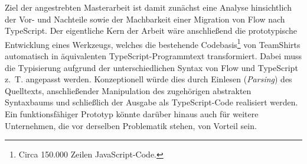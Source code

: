 Ziel der angestrebten Masterarbeit ist damit zunächst eine Analyse hinsichtlich der Vor- und Nachteile sowie der Machbarkeit einer Migration von Flow nach TypeScript. Der eigentliche Kern der Arbeit wäre anschließend die prototypische Entwicklung eines Werkzeugs, welches die bestehende Codebasis\footnote{Circa 150.000 Zeilen JavaScript-Code.} von TeamShirts automatisch in äquivalenten TypeScript-Programm\-text transformiert. Dabei muss die Typisierung aufgrund der unterschiedlichen Syntax von Flow und TypeScript z.~T. angepasst werden. Konzeptionell würde dies durch Einlesen (\emph{Parsing}) des Quelltexts, anschließender Manipulation des zugehörigen abstrakten Syntaxbaums und schließlich der Ausgabe als TypeScript-Code realisiert werden.
Ein funktionsfähiger Prototyp könnte darüber hinaus auch für weitere Unternehmen, die vor derselben Problematik stehen, von Vorteil sein.
